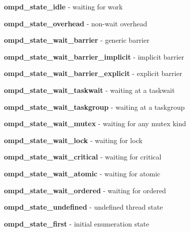 \label{ompd_state_idle}
\textbf{ompd\_state\_idle} - 
waiting for work
 
\label{ompd_state_overhead}
\textbf{ompd\_state\_overhead} - 
non-wait overhead

\label{ompd_state_wait_barrier}
\textbf{ompd\_state\_wait\_barrier} - 
generic barrier

\label{ompd_state_wait_barrier_implicit}
\textbf{ompd\_state\_wait\_barrier\_implicit} - 
implicit barrier

\label{ompd_state_wait_barrier_explicit}
\textbf{ompd\_state\_wait\_barrier\_explicit} - 
explicit barrier

\label{ompd_state_wait_taskwait}
\textbf{ompd\_state\_wait\_taskwait} - 
waiting at a taskwait

\label{ompd_state_wait_taskgroup}
\textbf{ompd\_state\_wait\_taskgroup} - 
waiting at a taskgroup

\label{ompd_state_wait_mutex}
\textbf{ompd\_state\_wait\_mutex} - 
waiting for any mutex kind

\label{ompd_state_wait_lock}
\textbf{ompd\_state\_wait\_lock} - 
waiting for lock

\label{ompd_state_wait_critical}
\textbf{ompd\_state\_wait\_critical} - 
waiting for critical

\label{ompd_state_wait_atomic}
\textbf{ompd\_state\_wait\_atomic} - 
waiting for atomic

\label{ompd_state_wait_ordered}
\textbf{ompd\_state\_wait\_ordered} - 
waiting for ordered

\label{ompd_state_undefined}
\textbf{ompd\_state\_undefined} - 
undefined thread state

\label{ompd_state_first}
\textbf{ompd\_state\_first} - 
initial enumeration state
